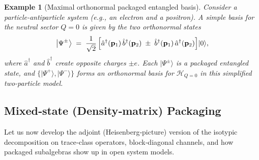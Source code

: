 \documentclass[12pt,a4paper]{article}
\newtheorem{example}{Example}
\begin{document}
\begin{example}[Maximal orthonormal packaged entangled basis]
	\label{exm:MaximalOrthonormalBasisOfPES}
	Consider a particle-antiparticle system (e.g., an electron and a positron).  
	A simple basis for the neutral sector $Q=0$ is given by the two orthonormal states
	\begin{equation}\label{eq:PESParticleAntiparticle}
		\bigl\lvert \Psi^\pm \bigr\rangle 
		\;=\;
		\frac{1}{\sqrt2}\,\Bigl[
		\hat{a}^\dagger(\mathbf{p}_1)\,\hat{b}^\dagger(\mathbf{p}_2)
		\;\pm\;
		\hat{b}^\dagger(\mathbf{p}_1)\,\hat{a}^\dagger(\mathbf{p}_2)
		\Bigr]
		\lvert 0\rangle,
	\end{equation}
	where $\hat{a}^\dagger$ and $\hat{b}^\dagger$ create opposite charges $\pm e$.  
	Each $\lvert \Psi^\pm\rangle$ is a packaged entangled state, and $\{\lvert\Psi^+\rangle,\lvert\Psi^-\rangle\}$ forms an orthonormal basis for $\mathcal{H}_{Q=0}$ in this simplified two-particle model.
\end{example}




\subsection{Mixed‑state (Density‑matrix) Packaging}


Let us now develop the adjoint (Heisenberg‑picture) version of the isotypic decomposition on trace‑class operators, block‑diagonal channels, and how packaged subalgebras show up in open system models. 
\end{document}
